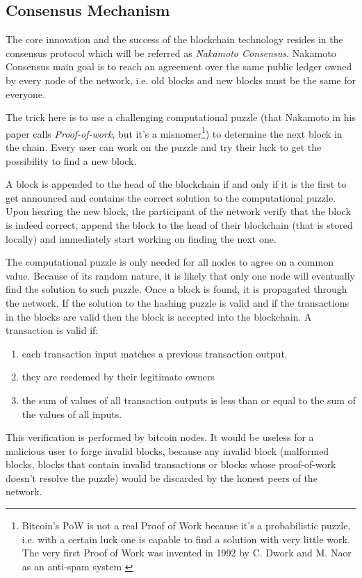 	\subsection{Consensus Mechanism}
		The core innovation and the success of the blockchain technology resides in the consensus protocol which will be referred as \textit{Nakamoto Consensus}. Nakamoto Consensus main goal is to reach an agreement over the same public ledger owned by every node of the network, i.e. old blocks and new blocks must be the same for everyone.
		
		The trick here is to use a challenging computational puzzle (that Nakamoto in his paper calls \textit{Proof-of-work}, but it's a misnomer\footnote{Bitcoin's PoW is not a real Proof of Work because it's a probabilistic puzzle, i.e. with a certain luck one is capable to find a solution with very little work. The very first Proof of Work was invented in 1992 by C. Dwork and M. Naor as an anti-spam system \cite{Dwork1992}}) to determine the next block in the chain. Every user can work on the puzzle and try their luck to get the possibility to find a new block.
		
		A block is appended to the head of the blockchain if and only if it is the first to get announced and contains the correct solution to the computational puzzle. Upon hearing the new block, the participant of the network verify that the block is indeed correct, append the block to the head of their blockchain (that is stored locally) and immediately start working on finding the next one.
		
		The computational puzzle is only needed for all nodes to agree on a common value. Because of its random nature, it is likely that only one node will eventually find the solution to such puzzle. Once a block is found, it is propagated through the network. If the solution to the hashing puzzle is valid and if the transactions in the blocks are valid then the block is accepted into the blockchain. A transaction is valid if:
		\begin{enumerate}
			\item each transaction input matches a previous transaction output.
			\item they are reedemed by their legitimate owners
			\item the sum of values of all transaction outputs is less than or equal to the sum of the values of all inputs.
		\end{enumerate}		
		This verification is performed by bitcoin nodes. It would be useless for a malicious user to forge invalid blocks, because any invalid block (malformed blocks, blocks that contain invalid transactions or blocks whose proof-of-work doesn't resolve the puzzle) would be discarded by the honest peers of the network.
		
